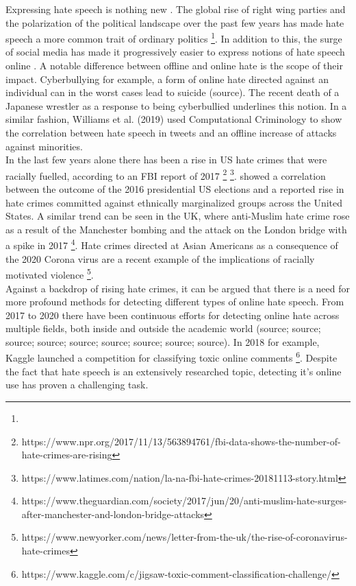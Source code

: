 \documentclass[a4paper,pdf]{article}
\begin{document}
Expressing hate speech is nothing new . The global rise of right wing parties and the polarization of the political landscape over the past few years has made hate speech a more common trait of ordinary politics \footnote{}. In addition to this, the surge of social media has made it progressively easier to express notions of hate speech online \cite{SchmidtAProcessing}. A notable difference between offline and online hate is the scope of their impact. Cyberbullying for example, a form of online hate directed against an individual can in the worst cases lead to suicide (source). The recent death of a Japanese wrestler as a response to being cyberbullied underlines this notion. In a similar fashion, Williams et al. (2019) used Computational Criminology to show the correlation between hate speech in tweets and an offline increase of attacks against minorities.\\

In the last few years alone there has been a rise in US hate crimes that were racially fuelled, according to an FBI report of 2017 \footnote{https://www.npr.org/2017/11/13/563894761/fbi-data-shows-the-number-of-hate-crimes-are-rising} \footnote{https://www.latimes.com/nation/la-na-fbi-hate-crimes-20181113-story.html}. 
\citet{Rushin2018TheCrimes} showed a correlation between the outcome of the 2016 presidential US elections and a reported rise in hate crimes committed against ethnically marginalized groups across the United States. A similar trend can be seen in the UK, where anti-Muslim hate crime rose as a result of the Manchester bombing and the attack on the London bridge with a spike in 2017 \footnote{https://www.theguardian.com/society/2017/jun/20/anti-muslim-hate-surges-after-manchester-and-london-bridge-attacks}. Hate crimes directed at Asian Americans as a consequence of the 2020 Corona virus are a recent example of the implications of racially motivated violence \footnote{https://www.newyorker.com/news/letter-from-the-uk/the-rise-of-coronavirus-hate-crimes}. \\

Against a backdrop of rising hate crimes, it can be argued that there is a need for more profound methods for detecting different types of online hate speech. From 2017 to 2020 there have been continuous efforts for detecting online hate across multiple fields, both inside and outside the academic world (source; source; source; source; source; source; source; source; source). In 2018 for example, Kaggle launched a competition for classifying toxic online comments \footnote{https://www.kaggle.com/c/jigsaw-toxic-comment-classification-challenge/}. Despite the fact that hate speech is an extensively researched topic, detecting it's online use has proven a challenging task.\\
\end{document}
